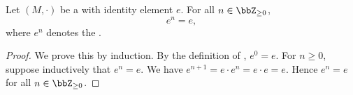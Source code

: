 \begin{lemma} \label{lemma:power_of_identity_in_a_monoid_is_the_identity}
    Let $(M,\cdot)$ be a  with identity element $e$. For all $n \in \bbZ_{\ge 0}$,
    $$e^n = e,$$
    where $e^n$ denotes the .
\end{lemma}
\begin{proof}
    We prove this by induction. By the definition of , $e^0 = e$. For $n \ge 0$, suppose inductively that $e^n = e$. We have $e^{n+1} = e \cdot e^n = e \cdot e = e$. Hence $e^n = e$ for all $n \in \bbZ_{\ge 0}$.
\end{proof}